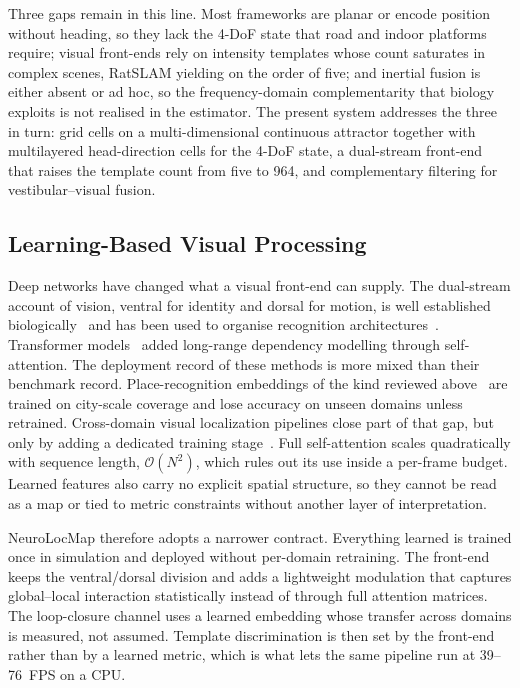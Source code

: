 Three gaps remain in this line. Most frameworks are planar or encode position without heading, so they lack the 4-DoF state that road and indoor platforms require; visual front-ends rely on intensity templates whose count saturates in complex scenes, RatSLAM yielding on the order of five; and inertial fusion is either absent or ad hoc, so the frequency-domain complementarity that biology exploits is not realised in the estimator. The present system addresses the three in turn: grid cells on a multi-dimensional continuous attractor together with multilayered head-direction cells for the 4-DoF state, a dual-stream front-end that raises the template count from five to 964, and complementary filtering for vestibular--visual fusion.

\subsection{Learning-Based Visual Processing}
\label{sec:related_learning}

Deep networks have changed what a visual front-end can supply. The dual-stream account of vision, ventral for identity and dorsal for motion, is well established biologically~\cite{Goodale1992,Mishkin1983} and has been used to organise recognition architectures~\cite{DiCarlo2012,Duffy1998}. Transformer models~\cite{Vaswani2017} added long-range dependency modelling through self-attention. The deployment record of these methods is more mixed than their benchmark record. Place-recognition embeddings of the kind reviewed above~\cite{Arandjelovic2016,wu2026pevpr} are trained on city-scale coverage and lose accuracy on unseen domains unless retrained. Cross-domain visual localization pipelines close part of that gap, but only by adding a dedicated training stage~\cite{lin2025uavpose}. Full self-attention scales quadratically with sequence length, $\mathcal{O}(N^2)$, which rules out its use inside a per-frame budget. Learned features also carry no explicit spatial structure, so they cannot be read as a map or tied to metric constraints without another layer of interpretation.

NeuroLocMap therefore adopts a narrower contract. Everything learned is trained once in simulation and deployed without per-domain retraining. The front-end keeps the ventral/dorsal division and adds a lightweight modulation that captures global--local interaction statistically instead of through full attention matrices. The loop-closure channel uses a learned embedding whose transfer across domains is measured, not assumed. Template discrimination is then set by the front-end rather than by a learned metric, which is what lets the same pipeline run at 39--76~FPS on a CPU.

